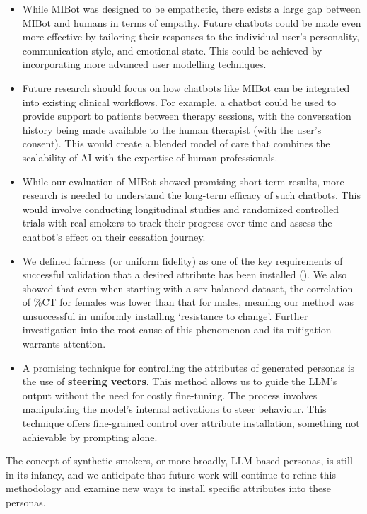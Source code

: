\begin{itemize}
    \item While MIBot was designed to be empathetic, there exists a large gap between MIBot and humans in terms of empathy. Future chatbots could be made even more effective by tailoring their responses to the individual user's personality, communication style, and emotional state. This could be achieved by incorporating more advanced user modelling techniques.
    \item Future research should focus on how chatbots like MIBot can be integrated into existing clinical workflows. For example, a chatbot could be used to provide support to patients between therapy sessions, with the conversation history being made available to the human therapist (with the user's consent). This would create a blended model of care that combines the scalability of AI with the expertise of human professionals.
    \item While our evaluation of MIBot showed promising short-term results, more research is needed to understand the long-term efficacy of such chatbots. This would involve conducting longitudinal studies and randomized controlled trials with real smokers to track their progress over time and assess the chatbot's effect on their cessation journey.
    \item  We defined fairness (or uniform fidelity) as one of the key requirements of successful validation that a desired attribute has been installed (). We also showed that even when starting with a sex-balanced dataset, the correlation of \%CT for females was lower than that for males, meaning our method was unsuccessful in uniformly installing `resistance to change'. Further investigation into the root cause of this phenomenon and its mitigation warrants attention.
    \item A promising technique for controlling the attributes of generated personas is the use of \textbf{steering vectors}. This method allows us to guide the LLM's output without the need for costly fine-tuning. The process involves manipulating the model's internal activations to steer behaviour. This technique offers fine-grained control over attribute installation, something not achievable by prompting alone.
\end{itemize}

The concept of synthetic smokers, or more broadly, LLM-based personas, is still in its infancy, and we anticipate that future work will continue to refine this methodology and examine new ways to install specific attributes into these personas.

